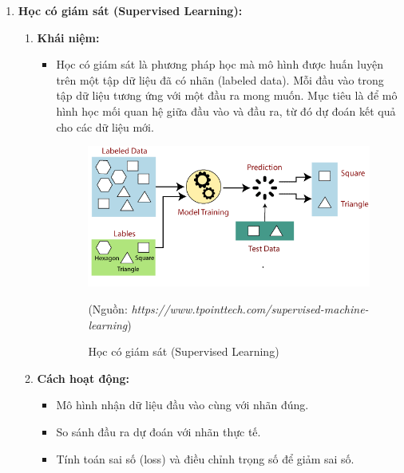 \documentclass[13pt]{article}
\begin{document}
\begin{enumerate}
    \item \textbf{Học có giám sát (Supervised Learning): }
    \begin{enumerate}
        \item \textbf{Khái niệm:}
        \begin{itemize}
            \item Học có giám sát là phương pháp học mà mô hình được huấn luyện trên một tập dữ liệu đã có nhãn (labeled data). Mỗi đầu vào trong tập dữ liệu tương ứng với một đầu ra mong muốn. Mục tiêu là để mô hình học mối quan hệ giữa đầu vào và đầu ra, từ đó dự đoán kết quả cho các dữ liệu mới.

    \begin{figure}[h!]
        \centering        \includegraphics[width=0.7\linewidth]{image/h5.png}
            \caption{Học có giám sát (Supervised Learning)}
            \label{fig:label1}
            (Nguồn: \textit{https://www.tpointtech.com/supervised-machine-learning})
    \end{figure}

        \end{itemize}
        \item \textbf{Cách hoạt động:}
        \begin{itemize}
            \item Mô hình nhận dữ liệu đầu vào cùng với nhãn đúng.
            \item So sánh đầu ra dự đoán với nhãn thực tế.
            \item Tính toán sai số (loss) và điều chỉnh trọng số để giảm sai số.
        \end{itemize}
        

\end{enumerate}
\end{enumerate}
\end{document}
